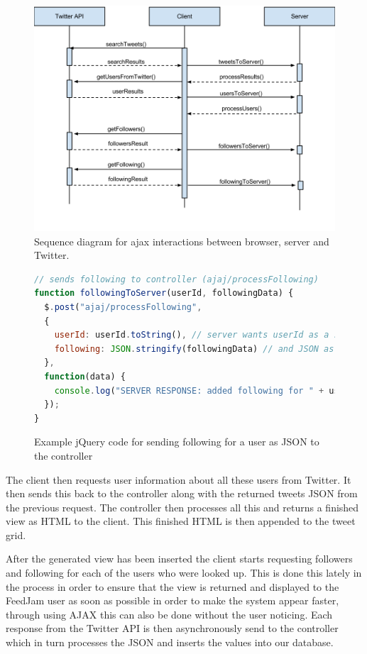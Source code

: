 \begin{figure}[ht]
    \begin{minipage}[b]{1\linewidth}
        \centering
        \includegraphics[width=1\textwidth]{figures/sequencediagram}
        \caption{Sequence diagram for ajax interactions between browser, server and Twitter.}
        \label{fig:AjaxInteractions}
    \end{minipage}
\end{figure}

\begin{figure}[h!]
\begin{lstlisting}[language=javascript]
// sends following to controller (ajaj/processFollowing)
function followingToServer(userId, followingData) {
  $.post("ajaj/processFollowing", 
  { 
    userId: userId.toString(), // server wants userId as a string
    following: JSON.stringify(followingData) // and JSON as a string
  },
  function(data) {
    console.log("SERVER RESPONSE: added following for " + userId);
  });
}
\end{lstlisting}
\caption{Example jQuery code for sending following for a user as JSON to the controller}
\label{ajaxRequest}
\end{figure}

The client then requests user information about all these users from Twitter. It then sends this back to the controller along with the returned tweets JSON from the previous request. The controller then processes all this and returns a finished view as HTML to the client. This finished HTML is then appended to the tweet grid.

After the generated view has been inserted the client starts requesting followers and following for each of the users who were looked up. This is done this lately in the process in order to ensure that the view is returned and displayed to the FeedJam user as soon as possible in order to make the system appear faster, through using AJAX this can also be done without the user noticing. Each response from the Twitter API is then asynchronously send to the controller which in turn processes the JSON and inserts the values into our database.

